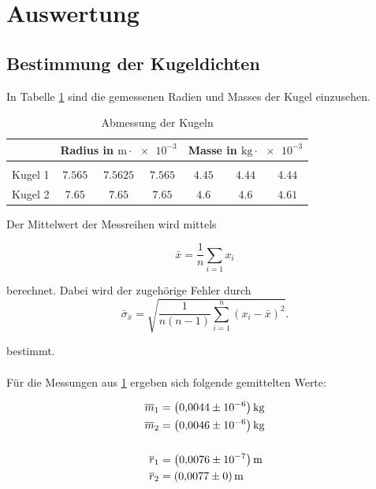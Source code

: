 \section{Auswertung}


\subsection{Bestimmung der Kugeldichten}

In Tabelle \ref{tab:messwerte_kugel} sind die gemessenen Radien und Masses der Kugel 
einzusehen.

\begin{table}
\centering
\begin{tabular} {ccccccc}
	\toprule
  & \multicolumn{3}{c}{Radius in $\si{\meter}\cdot \num{e-3}$}  & \multicolumn{3}{c}{Masse in $\si{\kilogram}\cdot \num{e-3}$} \\
\midrule \\
Kugel 1 & $\num{7.565} $&  $\num{7.5625} $ & $\num{7.565} $  & $\num{4.45}$ & $\num{4.44} $ & $\num{4.44} $ \\
Kugel 2  & $\num{7.65} $&  $\num{7.65} $ & $\num{7.65} $ & $\num{4.6}$ & $\num{4.6} $ & $\num{4.61} $ \\
\bottomrule
\end{tabular}
\caption{Abmessung der Kugeln}
\label{tab:messwerte_kugel}
\end{table}

Der Mittelwert der Messreihen wird mittels

\begin{equation}
\label{eq:mittel}
\bar{x}=\frac{1}{n}\sum_{i=1}x_i
\end{equation}

berechnet. Dabei wird der zugehörige Fehler
durch 
\begin{equation}
\label{eq:stand_ab}
\bar{\sigma}_{\bar{x}}=\sqrt{\frac{1}{n(n-1)}\sum_{i=1}^{n}(x_i-\bar{x})^2}.
\end{equation}

bestimmt.
\\ \hfill
\\
\hfill
Für die Messungen aus \ref{tab:messwerte_kugel} ergeben sich 
folgende gemittelten Werte:

\begin{align}
\label{eq:abmessungen_kugel}
\begin{aligned}
\overline{m}_{1}&= \left(\num{0.0044}\pm\num{e-6}\right) \si{\kilogram} \\
\overline{m}_{2}&= \left(\num{0.0046}\pm\num{e-6}\right) \si{\kilogram} \\
\hfill \\
\overline{r}_{1}&= \left(\num{0.0076}\pm\num{e-7}\right) \si{\meter} \\
\overline{r}_{2}&= \left(\num{0.0077}\pm\num{0}\right) \si{\meter} \\
\end{aligned}
\end{align}

